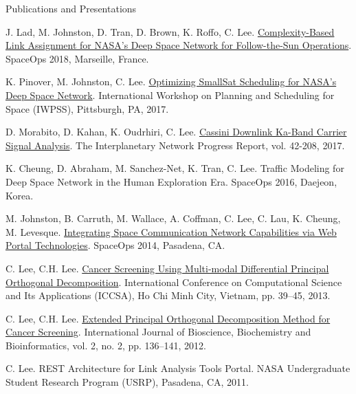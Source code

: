 \documentclass{resume} %
\begin{document}
\begin{rSection}{Publications and Presentations}
\item J. Lad, M. Johnston, D. Tran, D. Brown, K. Roffo, C. Lee. \href{https://github.com/carlynlee/lee-carlyn_resume/tree/master/papers/lad-spaceops2018-complexity.pdf}{Complexity-Based Link Assignment for NASA's Deep Space Network for Follow-the-Sun Operations}. SpaceOps 2018, Marseille, France.
\item K. Pinover, M. Johnston, C. Lee. \href{https://github.com/carlynlee/lee-carlyn_resume/tree/master/papers/pinover-iwpss2017-optimizing.pdf}{Optimizing SmallSat Scheduling for NASA's Deep Space Network}. International Workshop on Planning and Scheduling for Space (IWPSS), Pittsburgh, PA, 2017.
\item D. Morabito, D. Kahan, K. Oudrhiri, C. Lee. \href{https://github.com/carlynlee/lee-carlyn_resume/tree/master/papers/208B.pdf}{Cassini Downlink Ka-Band Carrier Signal Analysis}. The Interplanetary Network Progress Report, vol. 42-208, 2017.
\item K. Cheung, D. Abraham, M. Sanchez-Net, K. Tran, C. Lee. Traffic Modeling for Deep Space Network in the Human Exploration Era. SpaceOps 2016, Daejeon, Korea.
\item M. Johnston, B. Carruth, M. Wallace, A. Coffman, C. Lee, C. Lau, K. Cheung, M. Levesque. \href{https://github.com/carlynlee/lee-carlyn_resume/tree/master/papers/14-1362_A1b.pdf}{Integrating Space Communication Network Capabilities via Web Portal Technologies}. SpaceOps 2014, Pasadena, CA.
\item C. Lee, C.H. Lee. \href{https://github.com/carlynlee/lee-carlyn_resume/tree/master/papers/Cancer_Screening_Using_Multi-modal_Differential_Principal_Orthogonal_Decomposition.pdf}{Cancer Screening Using Multi-modal Differential Principal Orthogonal Decomposition}. International Conference on Computational Science and Its Applications (ICCSA), Ho Chi Minh City, Vietnam, pp. 39--45, 2013.
\item C. Lee, C.H. Lee. \href{https://github.com/carlynlee/lee-carlyn_resume/tree/master/papers/87-B139.pdf}{Extended Principal Orthogonal Decomposition Method for Cancer Screening}. International Journal of Bioscience, Biochemistry and Bioinformatics, vol. 2, no. 2, pp. 136--141, 2012.
\item C. Lee. REST Architecture for Link Analysis Tools Portal. NASA Undergraduate Student Research Program (USRP), Pasadena, CA, 2011.
\end{rSection}






\end{document}
